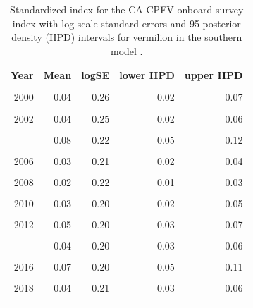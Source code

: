 \documentclass[11pt,
  english,
  a4paper,
]{article}
\begin{document}
\begin{table}

\caption{\label{tab:tab-index-cpfvonboard}Standardized index for the CA CPFV onboard survey index with log-scale standard errors and 95%
       posterior density (HPD) intervals for vermilion in the southern model .}
\centering
\begin{tabular}[t]{rrrrr}
\toprule
Year & Mean & logSE & lower HPD & upper HPD\\
\midrule
\cellcolor{gray!6}{1999} & \cellcolor{gray!6}{0.03} & \cellcolor{gray!6}{0.25} & \cellcolor{gray!6}{0.02} & \cellcolor{gray!6}{0.04}\\
2000 & 0.04 & 0.26 & 0.02 & 0.07\\
\cellcolor{gray!6}{2001} & \cellcolor{gray!6}{0.03} & \cellcolor{gray!6}{0.32} & \cellcolor{gray!6}{0.01} & \cellcolor{gray!6}{0.05}\\
2002 & 0.04 & 0.25 & 0.02 & 0.06\\
\cellcolor{gray!6}{2003} & \cellcolor{gray!6}{0.10} & \cellcolor{gray!6}{0.24} & \cellcolor{gray!6}{0.06} & \cellcolor{gray!6}{0.16}\\
\addlinespace
2004 & 0.08 & 0.22 & 0.05 & 0.12\\
\cellcolor{gray!6}{2005} & \cellcolor{gray!6}{0.04} & \cellcolor{gray!6}{0.21} & \cellcolor{gray!6}{0.03} & \cellcolor{gray!6}{0.06}\\
2006 & 0.03 & 0.21 & 0.02 & 0.04\\
\cellcolor{gray!6}{2007} & \cellcolor{gray!6}{0.04} & \cellcolor{gray!6}{0.21} & \cellcolor{gray!6}{0.02} & \cellcolor{gray!6}{0.05}\\
2008 & 0.02 & 0.22 & 0.01 & 0.03\\
\addlinespace
\cellcolor{gray!6}{2009} & \cellcolor{gray!6}{0.02} & \cellcolor{gray!6}{0.21} & \cellcolor{gray!6}{0.01} & \cellcolor{gray!6}{0.03}\\
2010 & 0.03 & 0.20 & 0.02 & 0.05\\
\cellcolor{gray!6}{2011} & \cellcolor{gray!6}{0.05} & \cellcolor{gray!6}{0.20} & \cellcolor{gray!6}{0.03} & \cellcolor{gray!6}{0.07}\\
2012 & 0.05 & 0.20 & 0.03 & 0.07\\
\cellcolor{gray!6}{2013} & \cellcolor{gray!6}{0.05} & \cellcolor{gray!6}{0.20} & \cellcolor{gray!6}{0.03} & \cellcolor{gray!6}{0.07}\\
\addlinespace
2014 & 0.04 & 0.20 & 0.03 & 0.06\\
\cellcolor{gray!6}{2015} & \cellcolor{gray!6}{0.07} & \cellcolor{gray!6}{0.20} & \cellcolor{gray!6}{0.05} & \cellcolor{gray!6}{0.11}\\
2016 & 0.07 & 0.20 & 0.05 & 0.11\\
\cellcolor{gray!6}{2017} & \cellcolor{gray!6}{0.05} & \cellcolor{gray!6}{0.21} & \cellcolor{gray!6}{0.03} & \cellcolor{gray!6}{0.07}\\
2018 & 0.04 & 0.21 & 0.03 & 0.06\\
\addlinespace
\cellcolor{gray!6}{2019} & \cellcolor{gray!6}{0.07} & \cellcolor{gray!6}{0.21} & \cellcolor{gray!6}{0.05} & \cellcolor{gray!6}{0.11}\\
\bottomrule
\end{tabular}
\end{table}
\end{document}
